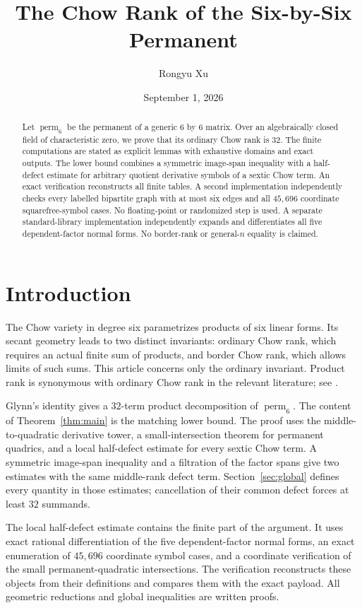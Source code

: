 \documentclass[11pt]{amsart}
\title{The Chow Rank of the Six-by-Six Permanent}
\author{Rongyu Xu}
\date{September 1, 2026}
\newcommand{\perm}{\operatorname{perm}}
\theoremstyle{definition}
\begin{document}
\begin{abstract}
Let \(\perm_6\) be the permanent of a generic \(6\) by \(6\) matrix.
Over an algebraically closed field of characteristic zero, we prove that its
ordinary Chow rank is \(32\). The finite computations are stated as explicit
lemmas with exhaustive domains and exact
outputs. The lower bound combines a
symmetric image-span inequality with a half-defect estimate for arbitrary
quotient derivative symbols of a sextic Chow term. An exact verification
reconstructs all finite tables. A second implementation independently checks
every labelled bipartite graph with at most six edges and all \(45{,}696\)
coordinate squarefree-symbol cases. No floating-point or randomized step is
used. A separate standard-library implementation independently expands and
differentiates all five dependent-factor normal forms. No border-rank or
general-\(n\) equality is claimed.
\end{abstract}

\maketitle

\section{Introduction}

The Chow variety in degree six parametrizes products of six linear forms.
Its secant geometry leads to two distinct invariants: ordinary Chow rank,
which requires an actual finite sum of products, and border Chow rank, which
allows limits of such sums.  This article concerns only the ordinary invariant.
Product rank is synonymous with ordinary Chow rank in the relevant literature;
see \cite{IltenTeitler2016}.

Glynn's identity gives a \(32\)-term product decomposition of \(\perm_6\).
The content of Theorem~\ref{thm:main} is the matching lower bound.  The proof
uses the middle-to-quadratic derivative tower, a small-intersection theorem
for permanent quadrics, and a local half-defect estimate for every sextic Chow
term.  A symmetric image-span inequality and a filtration of the factor spans
give two estimates with the same middle-rank defect term. Section~\ref{sec:global}
defines every quantity in those estimates; cancellation of their common
defect forces at least \(32\) summands.

The local half-defect estimate contains the finite part of the argument.  It
uses exact rational differentiation of the five dependent-factor normal
forms, an exact enumeration of \(45{,}696\) coordinate symbol cases, and a
coordinate verification of the small permanent-quadratic intersections. The
verification reconstructs these objects from their definitions and compares
them with the exact payload. All geometric reductions and global inequalities
are written proofs.
\end{document}
